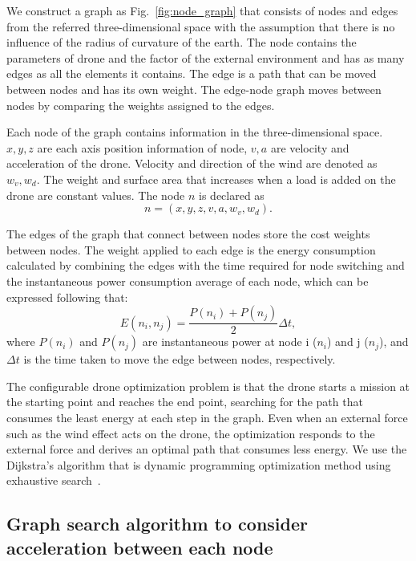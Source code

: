 \documentclass[journal]{./template/IEEEtran}
\begin{document}
We construct a graph as Fig.~\ref{fig:node_graph} that consists of nodes and edges from the referred three-dimensional space with the assumption that there is no influence of the radius of curvature of the earth.
The node contains the parameters of drone and the factor of the external environment and has as many edges as all the elements it contains. 
The edge is a path that can be moved between nodes and has its own weight. The edge-node graph moves between nodes by comparing the weights assigned to the edges.  

Each node of the graph contains information in the three-dimensional space. $x,y,z$ are each axis position information of node, $v,a$ are velocity and acceleration of the drone. 
Velocity and direction of the wind are denoted as $w_v,w_d$. The weight and surface area that increases when a load is added on the drone are constant values.
The node $n$ is declared as 
\begin{equation*}
n = (x, y, z, v, a, w_v, w_d).
\end{equation*}

The edges of the graph that connect between nodes store the cost weights between nodes.
The weight applied to each edge is the energy consumption calculated by combining the edges with the time required for node switching and the instantaneous power consumption average of each node, which can be expressed following that: 
\begin{equation*}
E(n_i, n_j) = \frac{P(n_i)+P(n_j)}{2} \Delta t,
\end{equation*}
where $P(n_i)$ and $P(n_j)$ are instantaneous power at node i ($n_i$) and j ($n_j$), and $\Delta t$ is the time taken to move the edge between nodes, respectively.

The configurable drone optimization problem is that the drone starts a mission at the starting point and reaches the end point, searching for the path that consumes the least energy at each step in the graph. 
Even when an external force such as the wind effect acts on the drone, the optimization responds to the external force and derives an optimal path that consumes less energy.
We use the Dijkstra's algorithm that is dynamic programming optimization method using exhaustive search~\cite{ref_19}. 





\subsection{Graph search algorithm to consider acceleration between each node}
\end{document}
